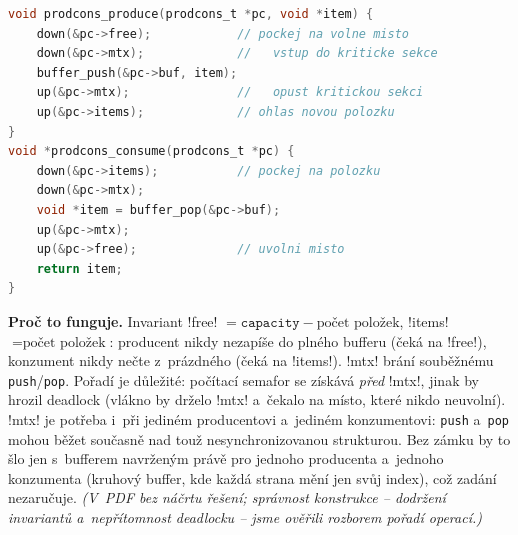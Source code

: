 \begin{priklad}
\begin{lstlisting}[language=C]
void prodcons_produce(prodcons_t *pc, void *item) {
    down(&pc->free);            // pockej na volne misto
    down(&pc->mtx);             //   vstup do kriticke sekce
    buffer_push(&pc->buf, item);
    up(&pc->mtx);               //   opust kritickou sekci
    up(&pc->items);             // ohlas novou polozku
}
void *prodcons_consume(prodcons_t *pc) {
    down(&pc->items);           // pockej na polozku
    down(&pc->mtx);
    void *item = buffer_pop(&pc->buf);
    up(&pc->mtx);
    up(&pc->free);              // uvolni misto
    return item;
}
\end{lstlisting}
\textbf{Proč to funguje.} Invariant \cd!free! $=\texttt{capacity}-\text{počet položek}$, \cd!items! $=\text{počet položek}$: producent nikdy nezapíše do plného bufferu (čeká na \cd!free!), konzument nikdy nečte z~prázdného (čeká na \cd!items!). \cd!mtx! brání souběžnému \texttt{push}/\texttt{pop}. Pořadí je důležité: počítací semafor se získává \emph{před} \cd!mtx!, jinak by hrozil deadlock (vlákno by drželo \cd!mtx! a~čekalo na místo, které nikdo neuvolní). \cd!mtx! je potřeba i~při jediném producentovi a~jediném konzumentovi: \texttt{push} a~\texttt{pop} mohou běžet současně nad touž nesynchronizovanou strukturou. Bez zámku by to šlo jen s~bufferem navrženým právě pro jednoho producenta a~jednoho konzumenta (kruhový buffer, kde každá strana mění jen svůj index), což zadání nezaručuje.
\textit{(V~PDF bez náčrtu řešení; správnost konstrukce -- dodržení invariantů a~nepřítomnost deadlocku -- jsme ověřili rozborem pořadí operací.)}
\end{priklad}

